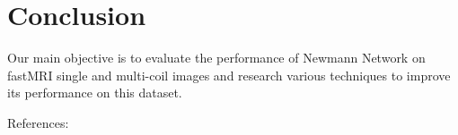 \documentclass[12pt,twoside]{article}
\begin{document}
\section{Conclusion}
Our main objective is to evaluate the performance of Newmann Network on fastMRI single and multi-coil images and research various techniques to improve its performance on this dataset.

References: \cite{DBLP:journals/corr/abs-1811-08839} \cite{DBLP:journals/corr/KamilovM15} \cite{DBLP:journals/corr/RomanoEM16} \cite{DBLP:journals/corr/abs-1712-02862}

 

\end{document}
